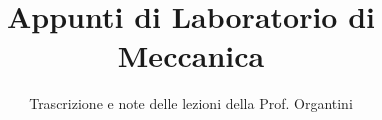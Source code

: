 \documentclass[a4paper,12pt]{article}
\title{Appunti di Laboratorio di Meccanica}
\author{Trascrizione e note delle lezioni della Prof. Organtini}
\date{}
\begin{document}
\maketitle
\projectintro
\tableofcontents
\newpage

\end{document}
